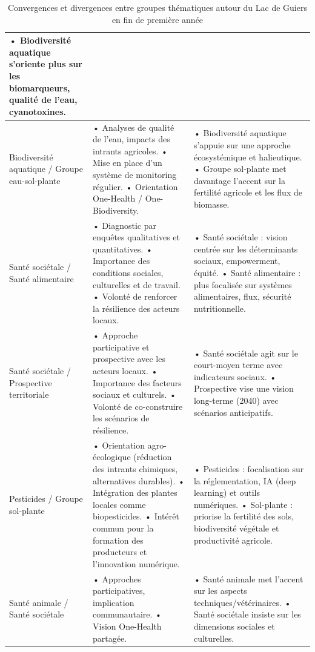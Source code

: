 \documentclass{article}
\begin{document}
\begin{table}[h!]
\begin{tabularx}{\textwidth}{>{\raggedright\arraybackslash}p{3.2cm} X X}
• Biodiversité aquatique s'oriente plus sur les biomarqueurs, qualité de l'eau, cyanotoxines. \\
\hline
Biodiversité aquatique / Groupe eau-sol-plante
& • Analyses de qualité de l'eau, impacts des intrants agricoles. \newline
• Mise en place d'un système de monitoring régulier. \newline
• Orientation One-Health / One-Biodiversity.
& • Biodiversité aquatique s'appuie sur une approche écosystémique et halieutique. \newline
• Groupe sol-plante met davantage l'accent sur la fertilité agricole et les flux de biomasse. \\
\hline
Santé sociétale / Santé alimentaire
& • Diagnostic par enquêtes qualitatives et quantitatives. \newline
• Importance des conditions sociales, culturelles et de travail. \newline
• Volonté de renforcer la résilience des acteurs locaux.
& • Santé sociétale : vision centrée sur les déterminants sociaux, empowerment, équité. \newline
• Santé alimentaire : plus focalisée sur systèmes alimentaires, flux, sécurité nutritionnelle. \\
\hline
Santé sociétale / Prospective territoriale
& • Approche participative et prospective avec les acteurs locaux. \newline
• Importance des facteurs sociaux et culturels. \newline
• Volonté de co-construire les scénarios de résilience.
& • Santé sociétale agit sur le court-moyen terme avec indicateurs sociaux. \newline
• Prospective vise une vision long-terme (2040) avec scénarios anticipatifs. \\
\hline
Pesticides / Groupe sol-plante
& • Orientation agro-écologique (réduction des intrants chimiques, alternatives durables). \newline
• Intégration des plantes locales comme biopesticides. \newline
• Intérêt commun pour la formation des producteurs et l'innovation numérique.
& • Pesticides : focalisation sur la réglementation, IA (deep learning) et outils numériques. \newline
• Sol-plante : priorise la fertilité des sols, biodiversité végétale et productivité agricole. \\
\hline
Santé animale / Santé sociétale
& • Approches participatives, implication communautaire. \newline
• Vision One-Health partagée.
& • Santé animale met l'accent sur les aspects techniques/vétérinaires. \newline
• Santé sociétale insiste sur les dimensions sociales et culturelles. \\

\end{tabularx}
\caption{Convergences et divergences entre groupes thématiques autour du Lac de Guiers en fin de première année}\label{tab:resultcs1}
\end{table}
\end{document}
